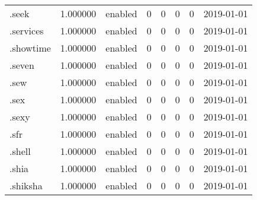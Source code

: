 \begin{tabular}{lrlrrrrl}
.seek                     &          1.000000 &         enabled &                           0 &                           0 &                           0 &                   0 &           2019-01-01 \\
.services                 &          1.000000 &         enabled &                           0 &                           0 &                           0 &                   0 &           2019-01-01 \\
.showtime                 &          1.000000 &         enabled &                           0 &                           0 &                           0 &                   0 &           2019-01-01 \\
.seven                    &          1.000000 &         enabled &                           0 &                           0 &                           0 &                   0 &           2019-01-01 \\
.sew                      &          1.000000 &         enabled &                           0 &                           0 &                           0 &                   0 &           2019-01-01 \\
.sex                      &          1.000000 &         enabled &                           0 &                           0 &                           0 &                   0 &           2019-01-01 \\
.sexy                     &          1.000000 &         enabled &                           0 &                           0 &                           0 &                   0 &           2019-01-01 \\
.sfr                      &          1.000000 &         enabled &                           0 &                           0 &                           0 &                   0 &           2019-01-01 \\
.shell                    &          1.000000 &         enabled &                           0 &                           0 &                           0 &                   0 &           2019-01-01 \\
.shia                     &          1.000000 &         enabled &                           0 &                           0 &                           0 &                   0 &           2019-01-01 \\
.shiksha                  &          1.000000 &         enabled &                           0 &                           0 &                           0 &                   0 &           2019-01-01 \\

\end{tabular}
